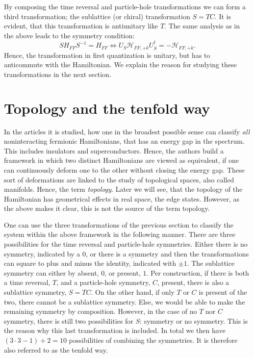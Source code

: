 By composing the time reversal and particle-hole transformations we can form a third transformation; the sublattice (or chiral) transformation $S = TC$. It is evident, that this transformation is antiunitary like $T$. The same analysis as in the above leads to the symmetry condition:
\begin{equation}
SH_{FF}S^{-1} = H_{FF} \Leftrightarrow U_S\mathcal{H}_{FF,+k} U^\dagger_S = - \mathcal{H}_{FF,+k}.
\end{equation}
Hence, the transformation in first quantization is unitary, but has to anticommute with the Hamiltonian. We explain the reason for studying these transformations in the next section.

\section{Topology and the tenfold way} \label{sec.Topology10foldway}
In the articles \cite{Ludwig.Topology, Chiu.Topology} it is studied, how one in the broadest possible sense can classify \textit{all} noninteracting fermionic Hamiltonians, that has an energy gap in the spectrum. This includes insulators and superconductors. Hence, the authors build a framework in which two distinct Hamiltonians are viewed as equivalent, if one can continuously deform one to the other without closing the energy gap. These sort of deformations are linked to the study of topological spaces, also called manifolds. Hence, the term \textit{topology}. Later we will see, that the topology of the Hamiltonian has geometrical effects in real space, the edge states. However, as the above makes it clear, this is not the source of the term topology.  

One can use the three transformations of the previous section to classify the system within the above framework in the following manner. There are three possibilities for the time reversal and particle-hole symmetries. Either there is no symmetry, indicated by a $0$, or there is a symmetry and then the transformations can square to plus and minus the identity, indicated with $\pm 1$. The sublattice symmetry can either by absent, $0$, or present, $1$. Per construction, if there is both a time reversal, $T$, and a particle-hole symmetry, $C$, present, there is also a sublattice symmetry, $S=TC$. On the other hand, if only $T$ or $C$ is present of the two, there cannot be a sublattice symmetry. Else, we would be able to make the remaining symmetry by composition. However, in the case of no $T$ nor $C$ symmetry, there is still two possibilities for $S$: symmetry or no symmetry. This is the reason why this last transformation is included. In total we then have $(3\cdot 3 - 1) + 2 = 10$ possibilities of combining the symmetries. It is therefore also referred to as the tenfold way. 

